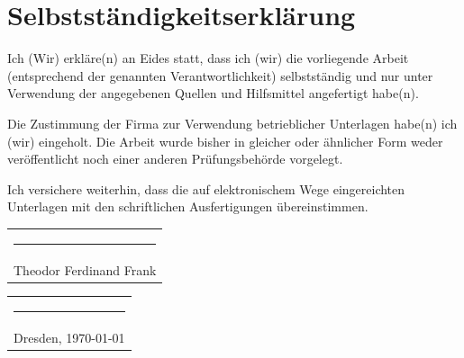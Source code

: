 \documentclass[12pt]{article}
\begin{document}
	\newpage
	\listoffigures
	\newpage

	\newpage
	\listoftables
	\newpage


	\newpage
	\thispagestyle{empty}
	\section*{Selbstständigkeitserklärung}

	Ich (Wir) erkläre(n) an Eides statt, dass ich (wir) die vorliegende Arbeit (entsprechend
	der genannten Verantwortlichkeit) selbstständig und nur unter Verwendung der angegebenen
	Quellen und Hilfsmittel angefertigt habe(n).
	\medskip

	Die Zustimmung der Firma zur Verwendung betrieblicher Unterlagen habe(n) ich (wir)
	eingeholt. Die Arbeit wurde bisher in gleicher oder ähnlicher Form weder
	veröffentlicht noch einer anderen Prüfungsbehörde vorgelegt.
	\medskip

	Ich versichere weiterhin, dass die auf elektronischem Wege eingereichten Unterlagen
	mit den schriftlichen Ausfertigungen übereinstimmen.

	\vspace{15mm}
	\hfill%
	\begin{tabular}[t]{c}
		\rule{10em}{0.4pt}      \\
		Theodor Ferdinand Frank
	\end{tabular}%
	\hfill%
	\begin{tabular}[t]{c}
		\rule{10em}{0.4pt} \\
		Dresden, \today
	\end{tabular}%
	\hfill\strut
\end{document}
